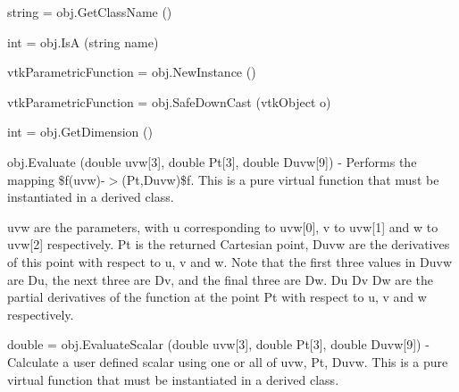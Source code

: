 \begin{DoxyItemize}
\item {\ttfamily string = obj.\-Get\-Class\-Name ()}  
\item {\ttfamily int = obj.\-Is\-A (string name)}  
\item {\ttfamily vtk\-Parametric\-Function = obj.\-New\-Instance ()}  
\item {\ttfamily vtk\-Parametric\-Function = obj.\-Safe\-Down\-Cast (vtk\-Object o)}  
\item {\ttfamily int = obj.\-Get\-Dimension ()}  
\item {\ttfamily obj.\-Evaluate (double uvw\mbox{[}3\mbox{]}, double Pt\mbox{[}3\mbox{]}, double Duvw\mbox{[}9\mbox{]})} -\/ Performs the mapping \$f(uvw)-\/$>$(Pt,Duvw)\$f. This is a pure virtual function that must be instantiated in a derived class.

uvw are the parameters, with u corresponding to uvw\mbox{[}0\mbox{]}, v to uvw\mbox{[}1\mbox{]} and w to uvw\mbox{[}2\mbox{]} respectively. Pt is the returned Cartesian point, Duvw are the derivatives of this point with respect to u, v and w. Note that the first three values in Duvw are Du, the next three are Dv, and the final three are Dw. Du Dv Dw are the partial derivatives of the function at the point Pt with respect to u, v and w respectively.  
\item {\ttfamily double = obj.\-Evaluate\-Scalar (double uvw\mbox{[}3\mbox{]}, double Pt\mbox{[}3\mbox{]}, double Duvw\mbox{[}9\mbox{]})} -\/ Calculate a user defined scalar using one or all of uvw, Pt, Duvw. This is a pure virtual function that must be instantiated in a derived class.


\end{DoxyItemize}
